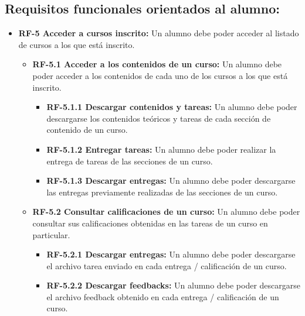 \subsection{Requisitos funcionales orientados al alumno:}
\begin{itemize}
\tightlist
\item
  \textbf{RF-5 Acceder a cursos inscrito:} Un alumno debe poder acceder al listado de cursos a los que está inscrito.
  
  \begin{itemize}
  \tightlist
  \item
    \textbf{RF-5.1 Acceder a los contenidos de un curso:} Un alumno debe poder acceder a los contenidos de cada uno de los cursos a los que está inscrito.
    
    \begin{itemize}
    \tightlist
    \item
      \textbf{RF-5.1.1 Descargar contenidos y tareas:} Un alumno debe poder descargarse los contenidos teóricos y tareas de cada sección de contenido de un curso.

    \item
      \textbf{RF-5.1.2 Entregar tareas:} Un alumno debe poder realizar la entrega de tareas de las secciones de un curso.
      
    \item
      \textbf{RF-5.1.3 Descargar entregas:} Un alumno debe poder descargarse las entregas previamente realizadas de las secciones de un curso.
  
    \end{itemize}

  \item
    \textbf{RF-5.2 Consultar calificaciones de un curso:} Un alumno debe poder consultar sus calificaciones obtenidas en las tareas de un curso en particular.
    
    \begin{itemize}
    \tightlist
    \item
      \textbf{RF-5.2.1 Descargar entregas:} Un alumno debe poder descargarse el archivo tarea enviado en cada entrega / calificación de un curso.

    \item
      \textbf{RF-5.2.2 Descargar feedbacks:} Un alumno debe poder descargarse el archivo feedback obtenido en cada entrega / calificación de un curso.
  
    \end{itemize}
  

\end{itemize}
\end{itemize}
